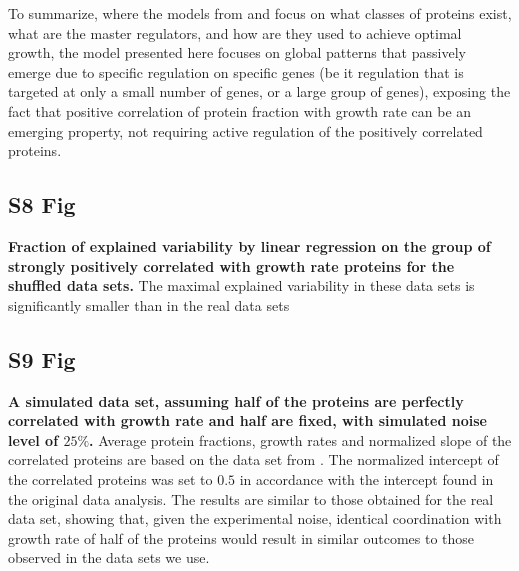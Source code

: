 \documentclass[10pt,letterpaper]{article}
\begin{document}
To summarize, where the models from \cite{Scott2010,Scott2011,Scott2014} and \cite{Hui_2015} focus on what classes of proteins exist, what are the master regulators, and how are they used to achieve optimal growth, the model presented here focuses on global patterns that passively emerge due to specific regulation on specific genes (be it regulation that is targeted at only a small number of genes, or a large group of genes), exposing the fact that positive correlation of protein fraction with growth rate can be an emerging property, not requiring active regulation of the positively correlated proteins.

\subsection*{S8 Fig}
\label{fig:shuffledexpvar}
    {\bf Fraction of explained variability by linear regression on the group of strongly positively correlated with growth rate proteins for the shuffled data sets.}
The maximal explained variability in these data sets is significantly smaller than in the real data sets
%

\subsection*{S9 Fig}
\label{fig:simulated}
    {\bf A simulated data set, assuming half of the proteins are perfectly correlated with growth rate and half are fixed, with simulated noise level of $25\%$.}
Average protein fractions, growth rates and normalized slope of the correlated proteins are based on the data set from \cite{Schmidt2015}.
The normalized intercept of the correlated proteins was set to $0.5$ in accordance with the intercept found in the original data analysis.
The results are similar to those obtained for the real data set, showing that, given the experimental noise, identical coordination with growth rate of half of the proteins would result in similar outcomes to those observed in the data sets we use.%
\end{document}
